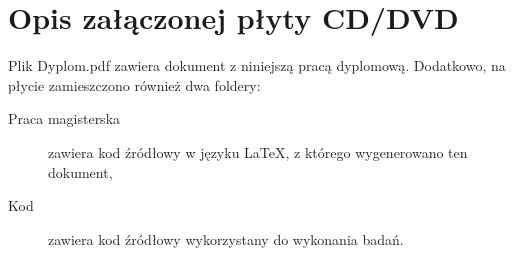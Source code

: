 \chapter{Opis załączonej płyty CD/DVD}
Plik Dyplom.pdf zawiera dokument z niniejszą pracą dyplomową.
Dodatkowo, na płycie zamieszczono również dwa foldery:
\begin{description}
	\item[Praca magisterska] zawiera kod źródłowy w języku LaTeX, z którego wygenerowano ten dokument,
	\item[Kod] zawiera kod źródłowy wykorzystany do wykonania badań.
\end{description}